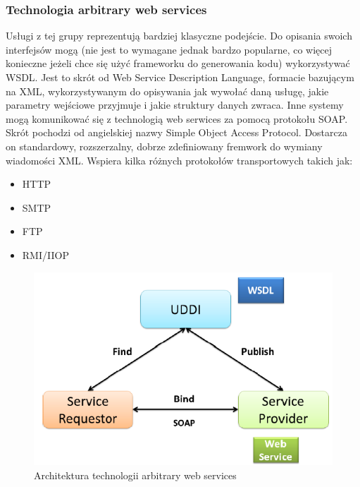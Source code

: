\subsubsection*{Technologia arbitrary web services}
Usługi z tej grupy reprezentują bardziej klasyczne podejście. Do opisania swoich interfejsów mogą (nie jest to wymagane jednak bardzo popularne, co więcej konieczne jeżeli chce się użyć frameworku do generowania kodu) wykorzystywać WSDL. Jest to skrót od Web Service Description Language, formacie bazującym na XML, wykorzystywanym do opisywania jak wywołać daną usługę, jakie parametry wejściowe przyjmuje i jakie struktury danych zwraca. Inne systemy mogą komunikować się z technologią web serwices za pomocą protokołu SOAP. Skrót pochodzi od angielskiej nazwy Simple Object Access Protocol. Dostarcza on standardowy, rozszerzalny, dobrze zdefiniowany fremwork do wymiany wiadomości XML. Wspiera kilka różnych protokołów transportowych takich jak:
 \begin{itemize}
	\item HTTP
	\item SMTP
	\item FTP
	\item RMI/IIOP
\end{itemize}  
\begin{figure}[!h]
	\centering
	\includegraphics[scale=0.50]{webSerwisyArchitektura.png} 
	\caption{Architektura technologii arbitrary web services}
\end{figure}

